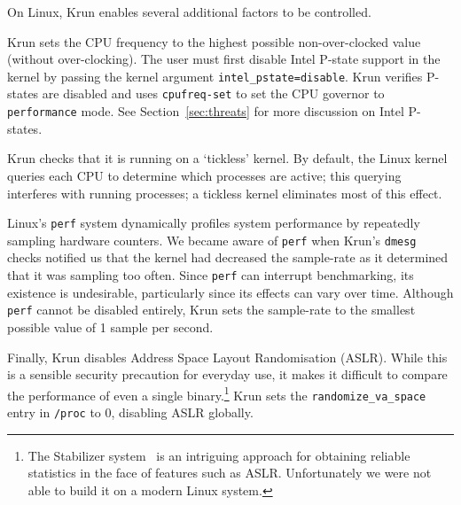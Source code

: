 \documentclass[a4paper,UKenglish]{lipics}
\newcommand{\krun}{Krun\xspace}
\begin{document}
On Linux, \krun enables several additional factors to be controlled.

\krun sets the CPU frequency to the highest possible non-over-clocked value
(without over-clocking). The user must first disable Intel P-state support in
the kernel by passing the kernel argument \texttt{intel\_pstate=disable}.
\krun verifies P-states are disabled and uses \texttt{cpufreq-set} to set
the CPU governor to \texttt{performance} mode. See
Section~\ref{sec:threats} for more discussion on Intel P-states.

\krun checks that it is running on a `tickless' kernel. By default, the Linux kernel
queries each CPU  to
determine which processes are active; this querying interferes with running
processes; a tickless kernel eliminates most  of this effect.

Linux's \texttt{perf} system dynamically profiles system performance by
repeatedly sampling hardware counters. We became aware of \texttt{perf} when
\krun's \texttt{dmesg} checks notified us that the kernel had decreased the
sample-rate as it determined that it was sampling too often. Since \texttt{perf}
can interrupt benchmarking, its existence is undesirable, particularly since its
effects can vary over time. Although \texttt{perf} cannot be disabled entirely,
\krun sets the sample-rate to the smallest possible value of 1 sample per
second.

Finally, \krun disables Address Space Layout Randomisation (ASLR). While this is
a sensible security precaution for everyday use, it makes it difficult to
compare the performance of even a single binary.\footnote{The Stabilizer
system~\cite{curtsinger} is an intriguing approach for obtaining reliable
statistics in the face of features such as ASLR. Unfortunately we were not able
to build it on a modern Linux system.} \krun sets the
\texttt{randomize\_va\_space} entry in \texttt{/proc} to 0, disabling ASLR
globally.
\end{document}
